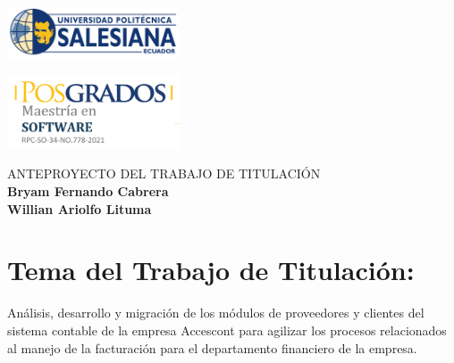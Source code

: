 \documentclass{article}
\begin{document}
\colorbox{white!10!}{
    \begin{minipage}[t]{0.05\textwidth} %
       \begin{flushright}
        \includegraphics[width=2in]{logo UPS.png}
       \end{flushright}
    \end{minipage}
    \begin{minipage}[H]{0.62 \textwidth} %
        \begin{center}
         
        \end{center}
     \end{minipage}
    \begin{minipage}[t]{0.05 \textwidth}
        \begin{flushleft}
        \hspace{10.25cm}
            \includegraphics[width=2in]{Posgrados.png}
        \end{flushleft}
    \end{minipage}
}

\vspace{0.1cm}
\begin{center}
{\large\textsc{ANTEPROYECTO DEL TRABAJO DE TITULACIÓN}} \\
\vspace{0.5cm}
{ \large \textbf{Bryam Fernando Cabrera}} \\ 
\vspace{0.25cm}
{ \large \textbf{Willian Ariolfo  Lituma}}
\end{center}
\vspace{0.1cm}

\section{Tema del Trabajo de Titulación:  }
\begin{center}
    Análisis, desarrollo y migración de los módulos de proveedores y clientes del sistema contable de la empresa Accescont para agilizar los procesos relacionados al manejo de la facturación para el departamento financiero de la empresa.
\end{center}
\end{document}
